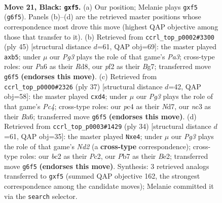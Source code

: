 \documentclass[11pt]{article}
\begin{document}
\clearpage

\begin{figure}[p]\centering
\begin{subfigure}{0.46\textwidth}\centering
\resizebox{\linewidth}{!}{%
\newchessgame
\chessboard[
  setfen={r4r1b/1ppb1k2/p1n3p1/4pP1p/2P5/2N2N2/PPB1KPP1/R1B3R1 b - - 0 21},
  showmover=false,
  pgfstyle=straightmove, color=movearrow, markmove={g6-f5}
]}
\caption{}
\end{subfigure}\hfill
\begin{subfigure}{0.46\textwidth}\centering
\resizebox{\linewidth}{!}{%
\newchessgame
\chessboard[
  setfen={3rr1k1/2pb2bp/p2p2p1/1P2n3/3NB3/4BP2/PP4PP/1K1RR3 b - - 0 23},
  showmover=false,
  pgfstyle=straightmove, color=movearrow, markmove={a6-b5}
]}
\caption{}
\end{subfigure}
\\[4pt]
\begin{subfigure}{0.46\textwidth}\centering
\resizebox{\linewidth}{!}{%
\newchessgame
\chessboard[
  setfen={2rr1k1b/pp1n1p1p/b5pP/2pN2N1/3PP3/4B3/PP3PP1/R3K2R b KQ - 2 19},
  showmover=false,
  pgfstyle=straightmove, color=movearrow, markmove={c5-d4}
]}
\caption{}
\end{subfigure}\hfill
\begin{subfigure}{0.46\textwidth}\centering
\resizebox{\linewidth}{!}{%
\newchessgame
\chessboard[
  setfen={r1b1r1k1/pp3p2/2n3pp/2p5/P3n3/2PRB3/2PNBPPP/2K4R w - - 4 18},
  showmover=false,
  pgfstyle=straightmove, color=movearrow, markmove={d2-e4}
]}
\caption{}
\end{subfigure}
\caption{\textbf{Move 21, Black: \texttt{gxf5}.} (a) Our position; Melanie plays \texttt{gxf5} (\texttt{g6f5}). Panels (b)--(d) are the retrieved master positions whose correspondence most drove this move (highest QAP objective among those that transfer to it). (b) Retrieved from \texttt{ccrl\_top\_p0002\#3300} (ply 45) [structural distance $d$=61, QAP obj=69]: the master played \texttt{axb5}; under $\mu$ our \emph{Pg3} plays the role of that game's \emph{Pa3}; cross-type roles: our \emph{P}a6 as their \emph{R}d8, our \emph{p}f2 as their \emph{B}g7; transferred move \texttt{g6f5} \textbf{(endorses this move)}. (c) Retrieved from \texttt{ccrl\_top\_p0000\#2326} (ply 37) [structural distance $d$=42, QAP obj=58]: the master played \texttt{cxd4}; under $\mu$ our \emph{Pg3} plays the role of that game's \emph{Pc4}; cross-type roles: our \emph{p}c4 as their \emph{N}d7, our \emph{n}c3 as their \emph{B}a6; transferred move \texttt{g6f5} \textbf{(endorses this move)}. (d) Retrieved from \texttt{ccrl\_top\_p0003\#1429} (ply 34) [structural distance $d$=61, QAP obj=35]: the master played \texttt{Nxe4}; under $\mu$ our \emph{Pg3} plays the role of that game's \emph{Nd2} (a \textbf{cross-type} correspondence); cross-type roles: our \emph{b}c2 as their \emph{P}c2, our \emph{P}b7 as their \emph{B}e2; transferred move \texttt{g6f5} \textbf{(endorses this move)}. Synthesis: 3 retrieved analogs transferred to \texttt{gxf5} (summed QAP objective 162, the strongest correspondence among the candidate moves); Melanie committed it via the \texttt{search} selector.}
\label{fig:thought-m41}
\end{figure}
\end{document}
